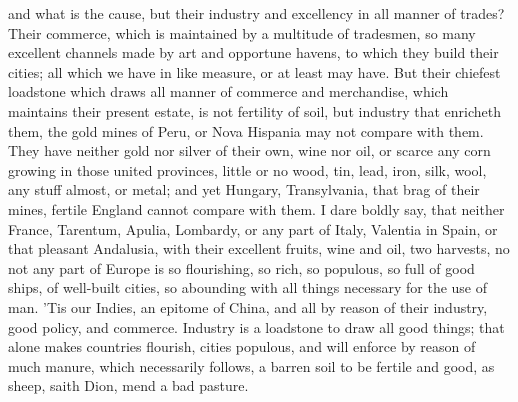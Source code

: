 {and what is the cause, but their industry and excellency in all manner
of trades? Their commerce, which is maintained by a multitude of
tradesmen, so many excellent channels made by art and opportune havens,
to which they build their cities; all which we have in like measure, or
at least may have. But their chiefest loadstone which draws all manner
of commerce and merchandise, which maintains their present estate, is
not fertility of soil, but industry that enricheth them, the gold mines
of Peru, or Nova Hispania may not compare with them. They have neither
gold nor silver of their own, wine nor oil, or scarce any corn growing
in those united provinces, little or no wood, tin, lead, iron, silk,
wool, any stuff almost, or metal; and yet Hungary, Transylvania, that
brag of their mines, fertile England cannot compare with them. I dare
boldly say, that neither France, Tarentum, Apulia, Lombardy, or any
part of Italy, Valentia in Spain, or that pleasant Andalusia, with
their excellent fruits, wine and oil, two harvests, no not any part of
Europe is so flourishing, so rich, so populous, so full of good ships,
of well-built cities, so abounding with all things necessary for the
use of man. 'Tis our Indies, an epitome of China, and all by reason of
their industry, good policy, and commerce. Industry is a loadstone to
draw all good things; that alone makes countries flourish, cities
populous, and will enforce by reason of much manure, which
necessarily follows, a barren soil to be fertile and good, as sheep,
saith Dion, mend a bad pasture.

}

